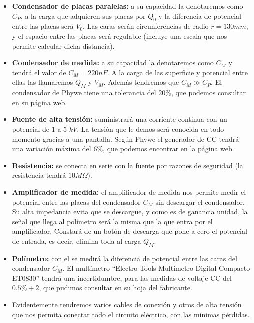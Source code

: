 \documentclass[12pt,a4paper]{article}
\begin{document}
\begin{itemize}

\item \textbf{Condensador de placas paralelas:} a su capacidad la denotaremos como $C_P$, a la carga que adquieren sus placas por $Q_0$ y la diferencia de potencial entre las placas será $V_0$. Las caras serán circunferencias de radio $r=130 mm$, y el espacio entre las placas será regulable (incluye una escala que nos permite calcular dicha distancia).

\item \textbf{Condensador de medida:} a su capacidad la denotaremos como $C_M$ y tendrá el valor de $C_M = 220 nF$. A la carga de las superficie y potencial entre ellas las llamaremos $Q_M$ y $V_M$. Además tendremos que $C_M \gg C_P$. El condensador de Phywe tiene una tolerancia del $20\%$, que podemos consultar en su página web.

\item \textbf{Fuente de alta tensión:} suministrará una corriente continua con un potencial de 1 a 5 $kV$. La tensión que le demos será conocida en todo momento gracias a una pantalla. Según Phywe el generador de CC tendrá una variación máxima del $6\%$, que podemos encontrar en la página web.

\item \textbf{Resistencia:} se conecta en serie con la fuente por razones de seguridad (la resistencia tendrá $10 M \Omega$).

\item \textbf{Amplificador de medida:} el amplificador de medida nos permite medir el potencial entre las placas del condensador $C_M$ sin descargar el condensador. Su alta impedancia evita que se descargue, y como es de ganancia unidad, la señal que llega al polímetro será la misma que la que entra por el amplificador. Constará de un botón de descarga que pone a cero el potencial de entrada, es decir, elimina toda al carga $Q_M$.

\item \textbf{Polímetro:} con el se medirá la diferencia de potencial entre las caras del condensador $C_M$. El multímetro ``Electro Tools Multímetro Digital Compacto ET0830'' tendrá una incertidumbre, para las medidas de voltaje CC del $0.5\%+2$, que pudimos consultar en su hoja del fabricante.

\item Evidentemente tendremos varios cables de conexión y otros de alta tensión que nos permita conectar todo el circuito eléctrico, con las mínimas pérdidas.

\end{itemize}
\end{document}
